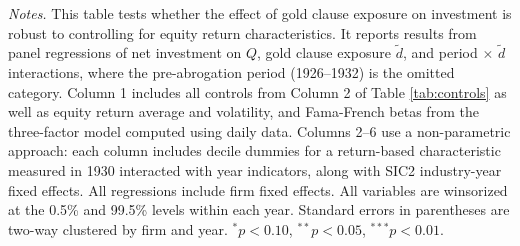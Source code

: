 \begin{table}[p]
\vspace*{3mm} \justifying \noindent
\scriptsize{\textit{Notes.} This table tests whether the effect of gold clause exposure on investment is robust to controlling for equity return characteristics. It reports results from panel regressions of net investment on $Q$, gold clause exposure $\tilde{d}$, and period $\times$ $\tilde{d}$ interactions, where the pre-abrogation period (1926--1932) is the omitted category. Column 1 includes all controls from Column 2 of Table \ref{tab:controls} as well as equity return average and volatility, and Fama-French betas from the three-factor model computed using daily data. Columns 2--6 use a non-parametric approach: each column includes decile dummies for a return-based characteristic measured in 1930 interacted with year indicators, along with SIC2 industry-year fixed effects. All regressions include firm fixed effects. All variables are winsorized at the 0.5\% and 99.5\% levels within each year. Standard errors in parentheses are two-way clustered by firm and year. $^{*}p<0.10$, $^{**}p<0.05$, $^{***}p<0.01$.}
\end{table}